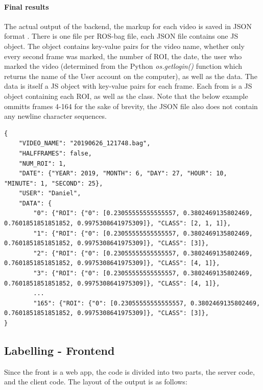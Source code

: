     \paragraph{Final results}
    The actual output of the backend, the markup for each video is saved in JSON format \cite{bray2017rfc}. There is one file per ROS-bag file, each JSON file contains one JS object. The object contains key-value pairs for the video name, whether only every second frame was marked, the number of ROI, the date, the user who marked the video (determined from the Python {\slshape os.getlogin()} function which returns the name of the User account on the computer), as well as the data. The data is itself a JS object with key-value pairs for each frame. Each from is a JS object containing each ROI, as well as the class. Note that the below example ommitts frames 4-164 for the sake of brevity, the JSON file also does not contain any newline character sequences.

    \begin{lstlisting}[style=JSStyle]
{
    "VIDEO_NAME": "20190626_121748.bag", 
    "HALFFRAMES": false, 
    "NUM_ROI": 1, 
    "DATE": {"YEAR": 2019, "MONTH": 6, "DAY": 27, "HOUR": 10, "MINUTE": 1, "SECOND": 25}, 
    "USER": "Daniel", 
    "DATA": {
        "0": {"ROI": {"0": [0.23055555555555557, 0.3802469135802469, 0.7601851851851852, 0.9975308641975309]}, "CLASS": [2, 1, 1]},
        "1": {"ROI": {"0": [0.23055555555555557, 0.3802469135802469, 0.7601851851851852, 0.9975308641975309]}, "CLASS": [3]}, 
        "2": {"ROI": {"0": [0.23055555555555557, 0.3802469135802469, 0.7601851851851852, 0.9975308641975309]}, "CLASS": [4, 1]}, 
        "3": {"ROI": {"0": [0.23055555555555557, 0.3802469135802469, 0.7601851851851852, 0.9975308641975309]}, "CLASS": [4, 1]},
        ...
        "165": {"ROI": {"0": [0.23055555555555557, 0.3802469135802469, 0.7601851851851852, 0.9975308641975309]}, "CLASS": [3]},
}\end{lstlisting}

    \subsection{Labelling - Frontend}
    Since the front is a web app, the code is divided into two parts, the server code, and the client code. The layout of the output is as follows:

